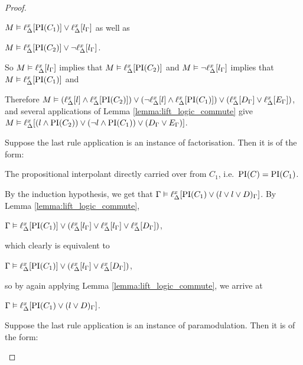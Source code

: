 \begin{proof}
\begin{indproof}
\begin{enumerate}
					$M \entails \lift{\Delta}{ \PI(C_1) }{x} \lor
					\lift{\Delta}{ l_\Gamma }{x}$ as well as

					$M \entails \lift{\Delta}{ \PI(C_2) }{x} \lor
					\lnot \lift{\Delta}{ l_\Gamma }{x}$.

					So $M \entails \lift{\Delta}{ l_\Gamma }{x}$ implies that 
					$M \entails \lift{\Delta}{\PI(C_2)}{x}$ and 
					$M \entails \lnot \lift{\Delta}{ l_\Gamma }{x}$  implies that 
					$M \entails \lift{\Delta}{\PI(C_1)}{x}$ and 

					Therefore
					$M\entails (\lif{l} \land \lif{\PI(C_2)}) \lor (\lnot \lif{l} \land \lif{\PI(C_1)}) \lor (\lif{D_\Gamma} \lor \lif{E_\Gamma}) $,
					and several applications of Lemma \ref{lemma:lift_logic_commute} give
					$M\entails \lif{(l \land \PI(C_2)) \lor (\lnot {l} \land {\PI(C_1)}) \lor ({D_\Gamma} \lor {E_\Gamma})} $.
			\end{enumerate}


		 Suppose the last rule application is an instance of factorisation. Then it is of the form:
			\begin{prooftree}
			\end{prooftree}

			The propositional interpolant directly carried over from $C_1$, i.e.~$\PI(C) = \PI(C_1)$.

			By the induction hypothesis, we get that $\Gamma \entails \lif{\PI(C_1) \lor (l \lor l \lor D)_\Gamma}$.
			By Lemma \ref{lemma:lift_logic_commute}, 

			$\Gamma \entails \lif{\PI(C_1)} \lor (\lif{l_\Gamma} \lor  \lif{l_\Gamma} \lor \lif{D_\Gamma})$,

			which clearly is equivalent to

			$\Gamma \entails \lif{\PI(C_1)} \lor (\lif{l_\Gamma} \lor \lif{D_\Gamma})$,

			so by again applying Lemma \ref{lemma:lift_logic_commute}, we arrive at

			$\Gamma \entails \lif{\PI(C_1) \lor (l \lor D)_\Gamma}$.



		 Suppose the last rule application is an instance of paramodulation. Then it is of the form:
			\begin{prooftree}
				\AxiomCm{C_1: D \lor s=t}
				\AxiomCm{C_2: E\occurat{s}{p}}
				\BinaryInfCm{C: D \lor E\occurat{t}{p}}
			\end{prooftree}


\end{indproof}
\end{proof}

